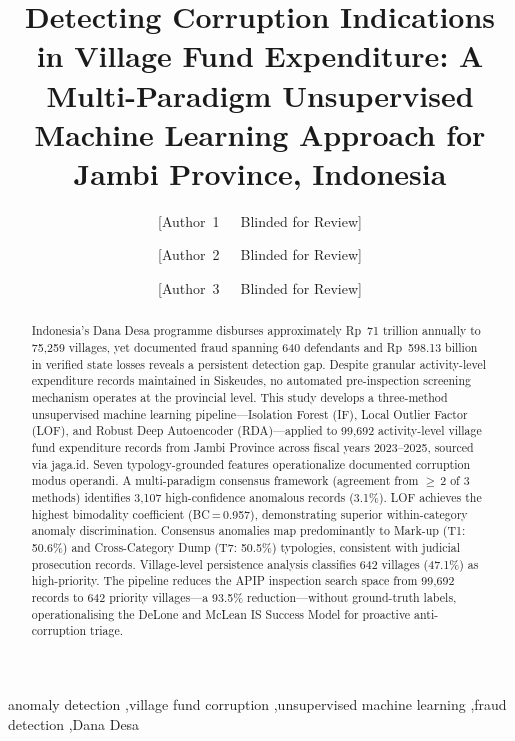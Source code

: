 \documentclass[3p,times,procedia]{elsarticle}
\begin{document}
\begin{frontmatter}


\title{Detecting Corruption Indications in Village Fund Expenditure: A Multi-Paradigm Unsupervised Machine Learning Approach for Jambi Province, Indonesia}

\author[a]{[Author~1~~~Blinded for Review]}
\author[a]{[Author~2~~~Blinded for Review]}
\author[a]{[Author~3~~~Blinded for Review]}
\address[a]{[Affiliation~~~Blinded for Review]}

\begin{abstract}
Indonesia's Dana Desa programme disburses approximately Rp~71 trillion annually to 75,259 villages, yet documented fraud spanning 640 defendants and Rp~598.13 billion in verified state losses reveals a persistent detection gap. Despite granular activity-level expenditure records maintained in Siskeudes, no automated pre-inspection screening mechanism operates at the provincial level. This study develops a three-method unsupervised machine learning pipeline---Isolation Forest (IF), Local Outlier Factor (LOF), and Robust Deep Autoencoder (RDA)---applied to 99,692 activity-level village fund expenditure records from Jambi Province across fiscal years 2023--2025, sourced via jaga.id. Seven typology-grounded features operationalize documented corruption modus operandi. A multi-paradigm consensus framework (agreement from $\geq$\,2 of 3 methods) identifies 3,107 high-confidence anomalous records (3.1\%). LOF achieves the highest bimodality coefficient (BC\,=\,0.957), demonstrating superior within-category anomaly discrimination. Consensus anomalies map predominantly to Mark-up (T1: 50.6\%) and Cross-Category Dump (T7: 50.5\%) typologies, consistent with judicial prosecution records. Village-level persistence analysis classifies 642 villages (47.1\%) as high-priority. The pipeline reduces the APIP inspection search space from 99,692 records to 642 priority villages---a 93.5\% reduction---without ground-truth labels, operationalising the DeLone and McLean IS Success Model for proactive anti-corruption triage.
\end{abstract}

\begin{keyword}
anomaly detection \sep village fund corruption \sep unsupervised machine learning \sep fraud detection \sep Dana Desa
\end{keyword}

\end{frontmatter}
\end{document}
